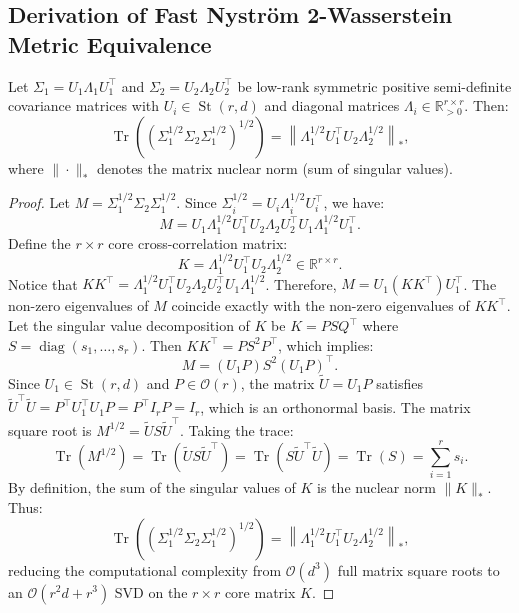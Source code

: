 \subsection{Derivation of Fast Nystr\"om 2-Wasserstein Metric Equivalence}
\begin{proposition}
Let $\Sigma_1 = U_1 \Lambda_1 U_1^\top$ and $\Sigma_2 = U_2 \Lambda_2 U_2^\top$ be low-rank symmetric positive semi-definite covariance matrices with $U_i \in \operatorname{St}(r, d)$ and diagonal matrices $\Lambda_i \in \mathbb{R}^{r \times r}_{>0}$. Then:
\begin{equation}
\operatorname{Tr}\left(\left(\Sigma_1^{1/2} \Sigma_2 \Sigma_1^{1/2}\right)^{1/2}\right) = \left\| \Lambda_1^{1/2} U_1^\top U_2 \Lambda_2^{1/2} \right\|_*,
\end{equation}
where $\|\cdot\|_*$ denotes the matrix nuclear norm (sum of singular values).
\end{proposition}
\begin{proof}
Let $M = \Sigma_1^{1/2} \Sigma_2 \Sigma_1^{1/2}$. Since $\Sigma_i^{1/2} = U_i \Lambda_i^{1/2} U_i^\top$, we have:
\begin{equation}
M = U_1 \Lambda_1^{1/2} U_1^\top U_2 \Lambda_2 U_2^\top U_1 \Lambda_1^{1/2} U_1^\top.
\end{equation}
Define the $r \times r$ core cross-correlation matrix:
\begin{equation}
K = \Lambda_1^{1/2} U_1^\top U_2 \Lambda_2^{1/2} \in \mathbb{R}^{r \times r}.
\end{equation}
Notice that $K K^\top = \Lambda_1^{1/2} U_1^\top U_2 \Lambda_2 U_2^\top U_1 \Lambda_1^{1/2}$.
Therefore, $M = U_1 (K K^\top) U_1^\top$.
The non-zero eigenvalues of $M$ coincide exactly with the non-zero eigenvalues of $K K^\top$. Let the singular value decomposition of $K$ be $K = P S Q^\top$ where $S = \operatorname{diag}(s_1, \dots, s_r)$.
Then $K K^\top = P S^2 P^\top$, which implies:
\begin{equation}
M = (U_1 P) S^2 (U_1 P)^\top.
\end{equation}
Since $U_1 \in \operatorname{St}(r, d)$ and $P \in \mathcal{O}(r)$, the matrix $\tilde{U} = U_1 P$ satisfies $\tilde{U}^\top \tilde{U} = P^\top U_1^\top U_1 P = P^\top I_r P = I_r$, which is an orthonormal basis.
The matrix square root is $M^{1/2} = \tilde{U} S \tilde{U}^\top$.
Taking the trace:
\begin{equation}
\operatorname{Tr}(M^{1/2}) = \operatorname{Tr}(\tilde{U} S \tilde{U}^\top) = \operatorname{Tr}(S \tilde{U}^\top \tilde{U}) = \operatorname{Tr}(S) = \sum_{i=1}^r s_i.
\end{equation}
By definition, the sum of the singular values of $K$ is the nuclear norm $\|K\|_*$. Thus:
\begin{equation}
\operatorname{Tr}\left(\left(\Sigma_1^{1/2} \Sigma_2 \Sigma_1^{1/2}\right)^{1/2}\right) = \left\| \Lambda_1^{1/2} U_1^\top U_2 \Lambda_2^{1/2} \right\|_*,
\end{equation}
reducing the computational complexity from $\mathcal{O}(d^3)$ full matrix square roots to an $\mathcal{O}(r^2 d + r^3)$ SVD on the $r \times r$ core matrix $K$.
\end{proof}

